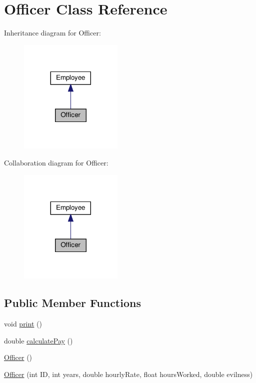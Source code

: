 \hypertarget{classOfficer}{}\section{Officer Class Reference}
\label{classOfficer}


Inheritance diagram for Officer\+:\nopagebreak
\begin{figure}[H]
\begin{center}
\leavevmode
\includegraphics[width=140pt]{classOfficer__inherit__graph}
\end{center}
\end{figure}


Collaboration diagram for Officer\+:\nopagebreak
\begin{figure}[H]
\begin{center}
\leavevmode
\includegraphics[width=140pt]{classOfficer__coll__graph}
\end{center}
\end{figure}
\subsection*{Public Member Functions}
\begin{DoxyCompactItemize}
\item 
void \hyperlink{classOfficer_aeadece05a1a0b7fb29bd412830d2e07a}{print} ()
\item 
double \hyperlink{classOfficer_a1fa1aad39b9e95be7a088990ebf17059}{calculate\+Pay} ()
\item 
\hyperlink{classOfficer_a80ac1e36a3f36c3a7e12b5dc9320ad89}{Officer} ()
\item 
\hyperlink{classOfficer_ac75c45d6e8628606278cb4ce6596f67f}{Officer} (int ID, int years, double hourly\+Rate, float hours\+Worked, double evilness)
\end{DoxyCompactItemize}

